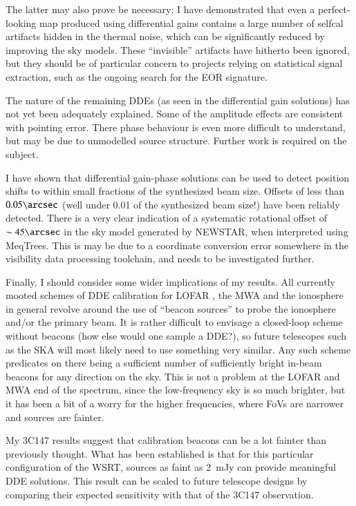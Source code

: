 \documentclass[]{aa}
\begin{document}
The latter may also prove be necessary: I have demonstrated that even a perfect-looking map produced using differential gains contains a large number of selfcal artifacts hidden in the thermal noise, which can be significantly reduced by improving the sky models. These ``invisible'' artifacts have hitherto been ignored, but they should be of particular concern to projects relying on statistical signal extraction, such as the ongoing search for the EOR signature.

The nature of the remaining DDEs (as seen in the differential gain solutions) has not yet been adequately explained. Some of the amplitude effects are consistent with pointing error. There phase behaviour is even more difficult to understand, but may be due to unmodelled source structure. Further work is required on the subject. 

I have shown that differential gain-phase solutions can be used to detect position shifts to within small fractions of the synthesized beam size. Offsets of less than $0.05\arcsec$ (well under 0.01 of the synthesized beam size!) have been reliably detected. There is a very clear indication of a systematic rotational offset of $\sim45\arcsec$ in the sky model generated by NEWSTAR, when interpreted using MeqTrees. This is may be due to a coordinate conversion error somewhere in the visibility data processing toolchain, and needs to be investigated further.

Finally, I should consider some wider implications of my results. All currently mooted schemes of DDE calibration for LOFAR \citep{JEN:LOFAR3}, the MWA \citep{Mitchell:MWA-cal} and the ionosphere in general \citep{Intema:SPAM,Cotton:FBC} revolve around the use of ``beacon sources'' to probe the ionosphere and/or the primary beam. It is rather difficult to envisage a closed-loop scheme without beacons (how else would one sample a DDE?), so future telescopes such as the SKA will most likely need to use something very similar. Any such scheme predicates on there being a sufficient number of sufficiently bright in-beam beacons for any direction on the sky. This is not a problem at the LOFAR and MWA end of the spectrum, since the low-frequency sky is so much brighter, but it has been a bit of a worry for the higher frequencies, where FoVs are narrower and sources are fainter.

My 3C147 results suggest that calibration beacons can be a lot fainter than previously thought. What has been established is that for this particular configuration of the WSRT, sources as faint as 2~mJy can provide meaningful DDE solutions. This result can be scaled to future telescope designs by comparing their expected sensitivity with that of the 3C147 observation.
\end{document}
